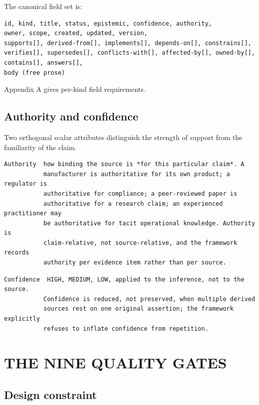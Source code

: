 \documentclass[11pt,a4paper]{article}
\begin{document}
The canonical field set is:

\begin{Verbatim}[fontsize=\footnotesize,breaklines=true,breakanywhere=true,breakautoindent=false,samepage=false]
id, kind, title, status, epistemic, confidence, authority,
owner, scope, created, updated, version,
supports[], derived-from[], implements[], depends-on[], constrains[],
verifies[], supersedes[], conflicts-with[], affected-by[], owned-by[],
contains[], answers[],
body (free prose)
\end{Verbatim}

Appendix A gives per-kind field requirements.

\subsection{Authority and confidence}

Two orthogonal scalar attributes distinguish the strength of support from the familiarity of the claim.

\begin{Verbatim}[fontsize=\footnotesize,breaklines=true,breakanywhere=true,breakautoindent=false,samepage=false]
Authority  how binding the source is *for this particular claim*. A
           manufacturer is authoritative for its own product; a regulator is
           authoritative for compliance; a peer-reviewed paper is
           authoritative for a research claim; an experienced practitioner may
           be authoritative for tacit operational knowledge. Authority is
           claim-relative, not source-relative, and the framework records
           authority per evidence item rather than per source.
\end{Verbatim}

\begin{Verbatim}[fontsize=\footnotesize,breaklines=true,breakanywhere=true,breakautoindent=false,samepage=false]
Confidence  HIGH, MEDIUM, LOW, applied to the inference, not to the source.
           Confidence is reduced, not preserved, when multiple derived
           sources rest on one original assertion; the framework explicitly
           refuses to inflate confidence from repetition.
\end{Verbatim}

\section{THE NINE QUALITY GATES}

\subsection{Design constraint}
\end{document}
